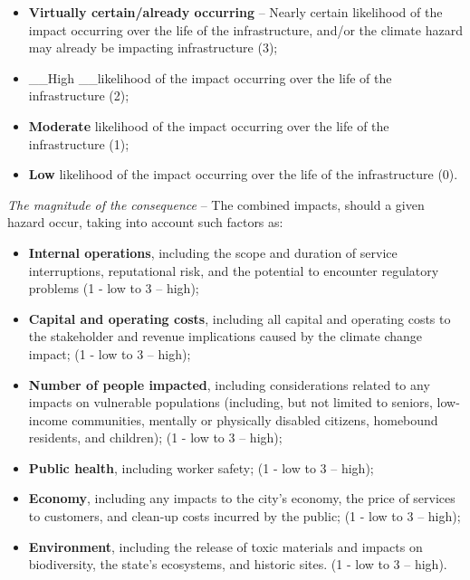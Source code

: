 \documentclass[
]{book}
\providecommand{\tightlist}{%
  \setlength{\itemsep}{0pt}\setlength{\parskip}{0pt}}
\begin{document}
\begin{itemize}
\tightlist
\item
  \textbf{Virtually certain/already occurring} -- Nearly certain likelihood of the impact occurring over the life of the infrastructure, and/or the climate hazard may already be impacting infrastructure (3);
\item
  \_\_High \_\_likelihood of the impact occurring over the life of the infrastructure (2);
\item
  \textbf{Moderate} likelihood of the impact occurring over the life of the infrastructure (1);
\item
  \textbf{Low} likelihood of the impact occurring over the life of the infrastructure (0).
\end{itemize}

\emph{The magnitude of the consequence} -- The combined impacts, should a given hazard occur, taking into account such factors as:

\begin{itemize}
\tightlist
\item
  \textbf{Internal operations}, including the scope and duration of service interruptions, reputational risk, and the potential to encounter regulatory problems (1 - low to 3 -- high);
\item
  \textbf{Capital and operating costs}, including all capital and operating costs to the stakeholder and revenue implications caused by the climate change impact; (1 - low to 3 -- high);
\item
  \textbf{Number of people impacted}, including considerations related to any impacts on vulnerable populations (including, but not limited to seniors, low-income communities, mentally or physically disabled citizens, homebound residents, and children); (1 - low to 3 -- high);
\item
  \textbf{Public health}, including worker safety; (1 - low to 3 -- high);
\item
  \textbf{Economy}, including any impacts to the city's economy, the price of services to customers, and clean-up costs incurred by the public; (1 - low to 3 -- high);
\item
  \textbf{Environment}, including the release of toxic materials and impacts on biodiversity, the state's ecosystems, and historic sites. (1 - low to 3 -- high).
\end{itemize}

\providecommand{\docline}[3]{\noalign{\global\setlength{\arrayrulewidth}{#1}}\arrayrulecolor[HTML]{#2}\cline{#3}}
\end{document}
